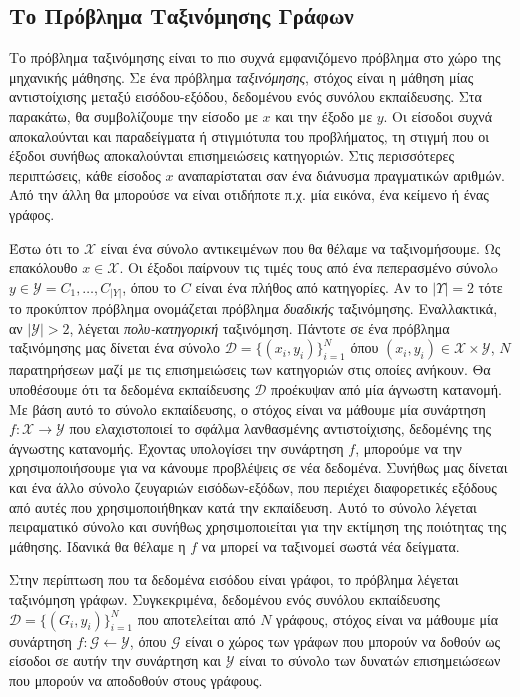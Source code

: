 \subsection{Το Πρόβλημα Ταξινόμησης Γράφων}
\label{subsection:graph_classification}
Το πρόβλημα ταξινόμησης είναι το πιο συχνά εμφανιζόμενο πρόβλημα στο χώρο της μηχανικής μάθησης.
Σε ένα πρόβλημα \textit{ταξινόμησης}, στόχος είναι η μάθηση μίας αντιστοίχισης μεταξύ εισόδου-εξόδου, δεδομένου ενός συνόλου εκπαίδευσης.
Στα παρακάτω, θα συμβολίζουμε την είσοδο με $x$ και την έξοδο με $y$.
Οι είσοδοι συχνά αποκαλούνται και παραδείγματα ή στιγμιότυπα του προβλήματος, τη στιγμή που οι έξοδοι συνήθως αποκαλούνται επισημειώσεις κατηγοριών.
Στις περισσότερες περιπτώσεις, κάθε είσοδος $x$ αναπαρίσταται σαν ένα διάνυσμα πραγματικών αριθμών.
Από την άλλη θα μπορούσε να είναι οτιδήποτε π.χ. μία εικόνα, ένα κείμενο ή ένας γράφος.\par
Έστω ότι το $\mathcal{X}$ είναι ένα σύνολο αντικειμένων που θα θέλαμε να ταξινομήσουμε.
Ως επακόλουθο $x \in \mathcal{X}$.
Οι έξοδοι παίρνουν τις τιμές τους από ένα πεπερασμένο σύνολo $y \in \mathcal{Y} = {C_{1}, \dots, C_{|Y|}}$, όπου το $C$ είναι ένα πλήθος από κατηγορίες.
Αν το $|\mathcal{Υ}| = 2$ τότε το προκύπτον πρόβλημα ονομάζεται πρόβλημα \textit{δυαδικής} ταξινόμησης.
Εναλλακτικά, αν $|\mathcal{Y}| > 2$, λέγεται \textit{πολυ-κατηγορική} ταξινόμηση.
Πάντοτε σε ένα πρόβλημα ταξινόμησης μας δίνεται ένα σύνολο $\mathcal{D} = \{(x_{i}, y_{i})\}^{N}_{i=1}$ όπου $(x_{i}, y_{i}) \in \mathcal{X} \times \mathcal{Y}$, $Ν$ παρατηρήσεων μαζί με τις επισημειώσεις των κατηγοριών στις οποίες ανήκουν.
Θα υποθέσουμε ότι τα δεδομένα εκπαίδευσης $\mathcal{D}$ προέκυψαν από μία άγνωστη κατανομή.
Με βάση αυτό το σύνολο εκπαίδευσης, ο στόχος είναι να μάθουμε μία συνάρτηση $f: \mathcal{X} \rightarrow \mathcal{Y}$ που ελαχιστοποιεί το σφάλμα λανθασμένης αντιστοίχισης, δεδομένης της άγνωστης κατανομής.
Έχοντας υπολογίσει την συνάρτηση $f$, μπορούμε να την χρησιμοποιήσουμε για να κάνουμε προβλέψεις σε νέα δεδομένα.
Συνήθως μας δίνεται και ένα άλλο σύνολο ζευγαριών εισόδων-εξόδων, που περιέχει διαφορετικές εξόδους από αυτές που χρησιμοποιήθηκαν κατά την εκπαίδευση.
Αυτό το σύνολο λέγεται πειραματικό σύνολο και συνήθως χρησιμοποιείται για την εκτίμηση της ποιότητας της μάθησης.
Ιδανικά θα θέλαμε η $f$ να μπορεί να ταξινομεί σωστά νέα δείγματα.\par
Στην περίπτωση που τα δεδομένα εισόδου είναι γράφοι, το πρόβλημα λέγεται ταξινόμηση γράφων.
Συγκεκριμένα, δεδομένου ενός συνόλου εκπαίδευσης $\mathcal{D} = \{(G_{i}, y_{i})\}^{N}_{i=1}$ που αποτελείται από $N$ γράφους, στόχος είναι να μάθουμε μία συνάρτηση $f: \mathcal{G} \leftarrow \mathcal{Y}$, όπου $\mathcal{G}$ είναι ο χώρος των γράφων που μπορούν να δοθούν ως είσοδοι σε αυτήν την συνάρτηση και $\mathcal{Y}$ είναι το σύνολο των δυνατών επισημειώσεων που μπορούν να αποδοθούν στους γράφους.
